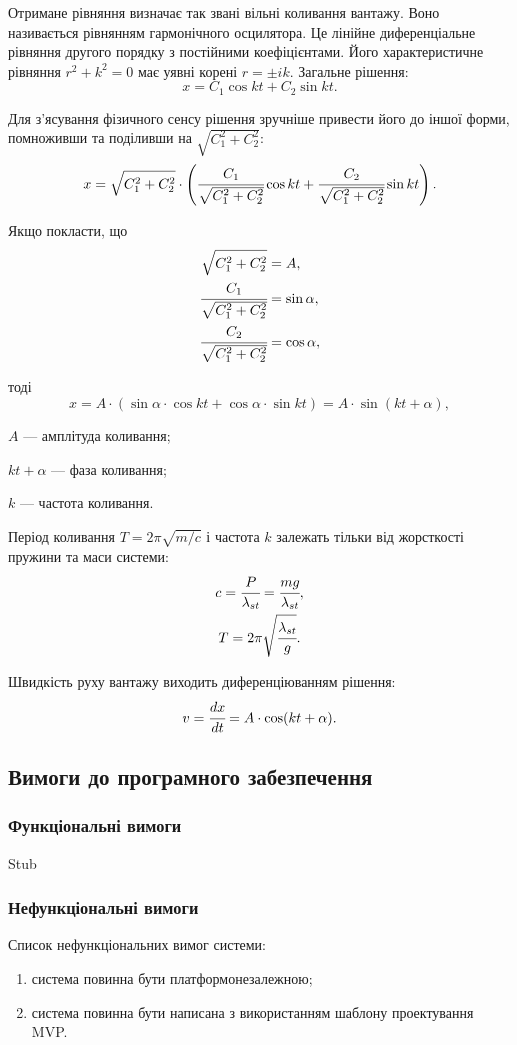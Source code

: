 Отримане рівняння визначає так звані вільні коливання вантажу.
Воно називається рівнянням гармонічного осцилятора.
Це лінійне диференціальне рівняння другого порядку з постійними коефіцієнтами.
Його характеристичне рівняння $r^2 + k^2 = 0$ має уявні корені $r=\pm ik$.
Загальне рішення:
\[
x = C_1 \cos kt + C_2 \sin kt.
\]

Для з'ясування фізичного сенсу рішення зручніше привести його до іншої форми, помноживши та поділивши на $\sqrt{C_1^2 + C_2^2}$:
\[
x = \sqrt{C_1^2 + C_2^2} \cdot \left( \cfrac{C_1}{\sqrt{C_1^2 + C_2^2}} \cos kt + \cfrac{C_2}{\sqrt{C_1^2 + C_2^2}} \sin kt \right).
\]

Якщо покласти, що
\begin{align*}
\sqrt{C_1^2 + C_2^2} &= A, \\
\cfrac{C_1}{\sqrt{C_1^2 + C_2^2}} &= \sin \alpha, \\
\cfrac{C_2}{\sqrt{C_1^2 + C_2^2}} &= \cos \alpha,
\end{align*}

тоді
\[
x = A \cdot (\sin\alpha \cdot \cos kt + \cos\alpha \cdot \sin kt) = A \cdot \sin (kt + \alpha),
\]
\begin{description}
\item[де] $A$ --- амплітуда коливання;
\item $kt + \alpha$ --- фаза коливання;
\item $k$ --- частота коливання.
\end{description}

Період коливання $T=2\pi\sqrt{m/c}$ і частота $k$ залежать тільки від жорсткості пружини та маси системи:
\begin{gather*}
c = \cfrac{P}{\lambda_{st}} = \cfrac{mg}{\lambda_{st}}, \\
T = 2\pi \sqrt{\cfrac{\lambda_{st}}{g}}.
\end{gather*}

Швидкість руху вантажу виходить диференціюванням рішення:
\[
v=\cfrac{dx}{dt}=A\cdot\cos(kt+\alpha).
\]

\subsection{Вимоги до програмного забезпечення}
\subsubsection{Функціональні вимоги}
Stub

\subsubsection{Нефункціональні вимоги}
Список нефункціональних вимог системи:
\begin{enumerate}[label={\arabic*)}]
	\item система повинна бути платформонезалежною;
	\item система повинна бути написана з використанням шаблону проектування MVP.
\end{enumerate}


